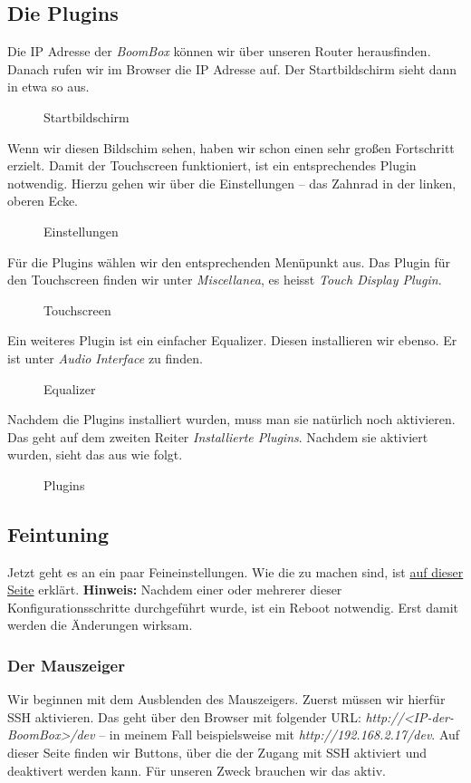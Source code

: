 \documentclass[12pt,a4paper]{article}
\newcommand{\bb}{\textit{BoomBox}}
\newcommand{\jpaimg}[2]{\begin{figure}[H]\centering\fbox{\texttt{[image: \#1]}}\caption{#2}\label{fig:#2}\end{figure}}
\begin{document}
\newpage
\subsection{Die Plugins}
Die IP Adresse der \bb{} können wir über unseren Router herausfinden. Danach rufen wir im Browser die IP Adresse auf. Der Startbildschirm sieht dann in etwa
so aus.

\jpaimg{./../images/vol-main.png}{Startbildschirm}

Wenn wir diesen Bildschim sehen, haben wir schon einen sehr großen Fortschritt erzielt. Damit der Touchscreen funktioniert, ist ein entsprechendes Plugin
notwendig. Hierzu gehen wir über die Einstellungen -- das Zahnrad in der linken, oberen Ecke.

\jpaimg{./../images/vol-setup.png}{Einstellungen}

Für die Plugins wählen wir den entsprechenden Menüpunkt aus. Das Plugin für den Touchscreen finden wir unter \textit{Miscellanea}, es heisst \textit{Touch
Display Plugin}.

\jpaimg{./../images/vol-touch.png}{Touchscreen}

Ein weiteres Plugin ist ein einfacher Equalizer. Diesen installieren wir ebenso. Er ist unter \textit{Audio Interface} zu finden.

\jpaimg{./../images/vol-equal.png}{Equalizer}

\newpage
Nachdem die Plugins installiert wurden, muss man sie natürlich noch aktivieren. Das geht auf dem zweiten Reiter \textit{Installierte Plugins}. Nachdem sie
aktiviert wurden, sieht das aus wie folgt.

\jpaimg{./../images/vol-plug-active.png}{Plugins}

\newpage
\subsection{Feintuning}
Jetzt geht es an ein paar Feineinstellungen. Wie die zu machen sind, ist \href{https://volumio.org/forum/guide-for-setting-touchscreen-backlight-control-t11425.html}{auf dieser Seite}
erklärt. \textbf{Hinweis:} Nachdem einer oder mehrerer dieser Konfigurationsschritte durchgeführt wurde, ist ein Reboot notwendig. Erst damit werden die
Änderungen wirksam.

\subsubsection{Der Mauszeiger}\label{subsubsection:SSH}
Wir beginnen mit dem Ausblenden des Mauszeigers. Zuerst müssen wir hierfür SSH aktivieren. Das geht über den Browser mit folgender URL:\@
\textit{http://<IP-der-BoomBox>/dev} -- in meinem Fall beispielsweise mit \textit{http://192.168.2.17/dev}. Auf dieser Seite finden wir Buttons, über die der
Zugang mit SSH aktiviert und deaktivert werden kann. Für unseren Zweck brauchen wir das aktiv.
\end{document}
